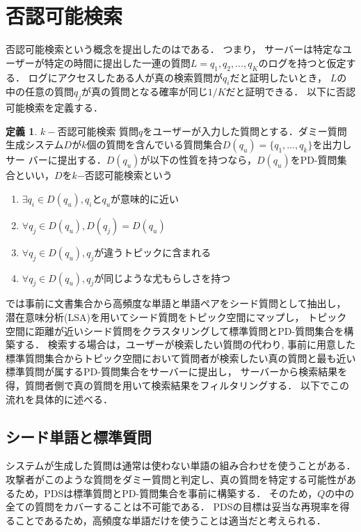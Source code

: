 \documentclass[master]{suribt}
\theoremstyle{definition}
\newtheorem{defi}[thm]{定義}
\begin{document}
 \section{否認可能検索}
 否認可能検索という概念を提出したのは\cite{}である．
 つまり， サーバーは特定なユーザーが特定の時間に提出した一連の質問$L = {q_1, q_2, \dots , q_K}$のログを持つと仮定する． 
 ログにアクセスしたある人が真の検索質問が$q_i$だと証明したいとき， $L$の中の任意の質問$q_j$が真の質問となる確率が同じ$1/K$だと証明できる．
 以下に否認可能検索を定義する．
 \begin{defi}{$k−$否認可能検索}
 	質問$q$をユーザーが入力した質問とする．ダミー質問生成システム$D$が$k$個の質問を含んでいる質問集合$D(q_u)=\{q_1, \dots , q_k\}$を出力しサー
	バーに提出する．$D(q_u)$が以下の性質を持つなら，$D(q_u)$をPD-質問集合といい，$D$を$k$−否認可能検索という
	\begin{enumerate}
	\item $\exists q_i \in D(q_u),q_i$と$q_u$が意味的に近い
	\item $\forall q_j \in D(q_u),D(q_j) = D(q_u)$
	\item $\forall q_j \in D(q_u),q_j$が違うトピックに含まれる
	\item $\forall q_j \in D(q_u),q_j$が同じような尤もらしさを持つ
	\end{enumerate}
  \end{defi}
 \cite{providing2009}では事前に文書集合から高頻度な単語と単語ペアをシード質問として抽出し，
 潜在意味分析(LSA)\cite{}を用いてシード質問をトピック空間にマップし，
 トピック空間に距離が近いシード質問をクラスタリングして標準質問とPD-質問集合を構築する．
 検索する場合は，ユーザーが検索したい質問の代わり,
 事前に用意した標準質問集合からトピック空間において質問者が検索したい真の質問と最も近い標準質問が属するPD-質問集合をサーバーに提出し，
 サーバーから検索結果を得，質問者側で真の質問を用いて検索結果をフィルタリングする．
 以下でこの流れを具体的に述べる．
 \subsection{シード単語と標準質問}
 システムが生成した質問は通常は使わない単語の組み合わせを使うことがある．
 攻撃者がこのような質問をダミー質問と判定し、真の質問を特定する可能性があるため，PDSは標準質問とPD-質問集合を事前に構築する．
 そのため，$Q$の中の全ての質問をカバーすることは不可能である．
 PDSの目標は妥当な再現率を得ることであるため，高頻度な単語だけを使うことは適当だと考えられる．
 
\end{document}
